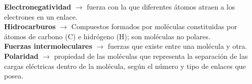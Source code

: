 \begin{defcard}
        \textbf{Electronegatividad} $\rightarrow$ fuerza con la que diferentes átomos atraen a los electrones en un enlace.\\
        \textbf{Hidrocarburos} $\rightarrow$ Compuestos formados por moléculas constituidas por átomos de carbono (C) e hidrógeno (H); son moléculas no polares.\\
        \textbf{Fuerzas intermoleculares} $\rightarrow$ fuerzas que existe entre una molécula y otra.\\
        \textbf{Polaridad} $\rightarrow$ propiedad de las moléculas que representa la separación de las cargas eléctricas dentro de la molécula, según el número y tipo de enlaces que posea.\\
\end{defcard}